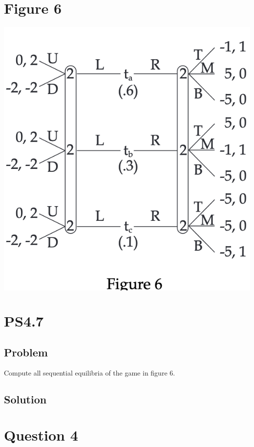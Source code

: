 \documentclass[10pt, a4paper]{article}
\begin{document}
  \section*{Figure 6}
    \begin{center}
      \includegraphics*{Fig6.png}
    \end{center}
  \section*{PS4.7}
    \subsection*{Problem}
      Compute all sequential equilibria of the game in figure 6.
    \subsection*{Solution}
  \section*{Question 4}
\end{document}
